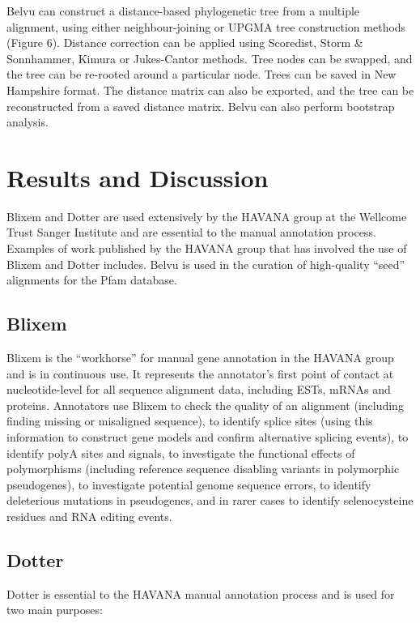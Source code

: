 \documentclass[10pt]{bmc_article}
\newenvironment{bmcformat}{\begin{raggedright}\baselineskip20pt\sloppy\setboolean{publ}{false}}{\end{raggedright}\baselineskip20pt\sloppy}
\begin{document}
\begin{bmcformat}
Belvu can construct a distance-based phylogenetic tree from a multiple alignment, using either neighbour-joining or UPGMA tree construction methods (Figure 6).  Distance correction can be applied using Scoredist\cite{So05}, Storm \& Sonnhammer, Kimura or Jukes-Cantor methods.  Tree nodes can be swapped, and the tree can be re-rooted around a particular node. Trees can be saved in New Hampshire format.  The distance matrix can also be exported, and the tree can be reconstructed from a saved distance matrix.  Belvu can also perform bootstrap analysis.


 
\section*{Results and Discussion}
Blixem and Dotter are used extensively by the HAVANA group at the Wellcome Trust Sanger Institute and are essential to the manual annotation process. Examples of work published by the HAVANA group that has involved the use of Blixem and Dotter includes\cite{Ha06,Ma10,20003482,16925837,Mudge06052011,18507838}.  Belvu is used in the curation of high-quality ``seed'' alignments for the Pfam database\cite{Fi10}. 

\subsection*{Blixem}
Blixem is the ``workhorse'' for manual gene annotation in the HAVANA group and is in continuous use. It represents the annotator's first point of contact at nucleotide-level for all sequence alignment data, including ESTs, mRNAs and proteins. Annotators use Blixem to check the quality of an alignment (including finding missing or misaligned sequence), to identify splice sites (using this information to construct gene models and confirm alternative splicing events), to identify polyA sites and signals, to investigate the functional effects of polymorphisms (including reference sequence disabling variants in polymorphic pseudogenes), to investigate potential genome sequence errors, to identify deleterious mutations in pseudogenes, and in rarer cases to identify selenocysteine residues and RNA editing events.

\subsection*{Dotter}
Dotter is essential to the HAVANA manual annotation process and is used for two main purposes:


\end{bmcformat}
\end{document}
